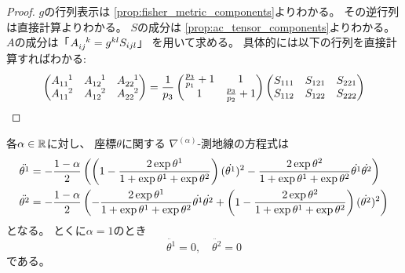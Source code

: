\documentclass[report]{jlreq}
\begin{document}
\begin{proof}
    $g$の行列表示は
    \cref{prop:fisher_metric_components}よりわかる。
    その逆行列は直接計算よりわかる。
    $S$の成分は
    \cref{prop:ac_tensor_components}よりわかる。
    $A$の成分は「$A_{ij}^{\hphantom{ij}k} = g^{kl} S_{ijl}$」
    を用いて求める。
    具体的には以下の行列を直接計算すればわかる:
    \begin{equation}
        \begin{pmatrix}
            A_{11}^{\hphantom{11}1}
                & A_{12}^{\hphantom{12}1}
                & A_{22}^{\hphantom{22}1}
                \\
            A_{11}^{\hphantom{11}2}
                & A_{12}^{\hphantom{12}2}
                & A_{22}^{\hphantom{22}2}
        \end{pmatrix}
            =
                \frac{1}{p_3}
                \begin{pmatrix}
                    \frac{p_3}{p_1} + 1 & 1 \\
                    1 & \frac{p_3}{p_2} + 1
                \end{pmatrix}
                \begin{pmatrix}
                    S_{111}
                        & S_{121}
                        & S_{221}
                        \\
                    S_{112}
                        & S_{122}
                        & S_{222}
                \end{pmatrix}
    \end{equation}
\end{proof}

\begin{proposition}[$n = 3$での測地線方程式]
    各$\alpha \in \mathbb{R}$に対し、
    座標$\theta$に関する
    $\nabla^{(\alpha)}$-測地線の方程式は
    \begin{alignat}{1}
        \ddot{\theta^1}
            &=
                - \frac{1 - \alpha}{2}
                \left({
                    \left({
                        1 - \frac{2 \exp \theta^1}{1 + \exp \theta^1 + \exp \theta^2}
                    }\right)
                    (\dot{\theta^1})^2
                    -
                    \frac{2 \exp \theta^2}{1 + \exp \theta^1 + \exp \theta^2}
                    \dot{\theta^1} \dot{\theta^2}
                }\right)
                \\
        \ddot{\theta^2}
            &=
                - \frac{1 - \alpha}{2}
                \left({
                    -
                    \frac{2 \exp \theta^1}{1 + \exp \theta^1 + \exp \theta^2}
                    \dot{\theta^1} \dot{\theta^2}
                    + \left({
                        1 - \frac{2 \exp \theta^2}{1 + \exp \theta^1 + \exp \theta^2}
                    }\right)
                    (\dot{\theta^2})^2
                }\right)
    \end{alignat}
    となる。
    とくに$\alpha = 1$のとき
    \begin{equation}
        \ddot{\theta^1} = 0,
            \quad
            \ddot{\theta^2} = 0
    \end{equation}
    である。
\end{proposition}
\end{document}
